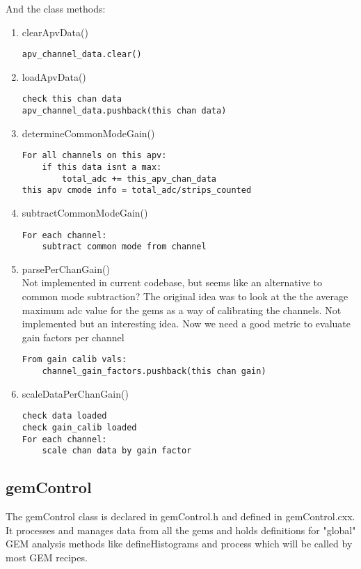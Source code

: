 \documentclass[11pt]{article}
\begin{document}
	And the class methods:
	\begin{enumerate}
		\item clearApvData()
		\begin{lstlisting}
apv_channel_data.clear()
		\end{lstlisting}
		
		\item loadApvData()
		\begin{lstlisting}
check this chan data
apv_channel_data.pushback(this chan data)
		\end{lstlisting}
	
		\item determineCommonModeGain()
		\begin{lstlisting}
For all channels on this apv:
	if this data isnt a max:
		total_adc += this_apv_chan_data
this apv cmode info = total_adc/strips_counted
		\end{lstlisting}
		
		\item subtractCommonModeGain()
		\begin{lstlisting}
For each channel:
	subtract common mode from channel
		\end{lstlisting}
		
		\item parsePerChanGain() \\
Not implemented in current codebase, but seems like an alternative to common mode subtraction? The original idea was to look at the the average maximum adc value for the gems as a way of calibrating the channels. Not implemented but an interesting idea. Now we need a good metric to evaluate gain factors per channel
		\begin{lstlisting}
From gain calib vals:
	channel_gain_factors.pushback(this chan gain)
		\end{lstlisting}

		\item scaleDataPerChanGain()
		\begin{lstlisting}
check data loaded
check gain_calib loaded
For each channel:
	scale chan data by gain factor
		\end{lstlisting}
		
	\end{enumerate}
	
	\subsection{gemControl}
	The gemControl class is declared in gemControl.h and defined in gemControl.cxx. It processes and manages data from all the gems and holds definitions for "global" GEM analysis methods like defineHistograms and process which will be called by most GEM recipes. 
		
\end{document}
